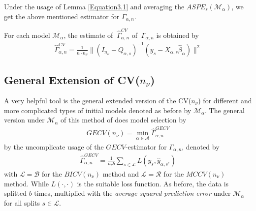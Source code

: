 \documentclass[Research_Module_ES.tex]{subfiles}
\begin{document}
Under the usage of Lemma \ref{Equation3.1} and averaging the $ASPE_{s}(\mathcal{M}_\alpha)$, we get the above mentioned estimator for $\Gamma_{\alpha,n}$.
\begin{claim}
	For each model $\mathcal{M}_\alpha$, the estimate of $~\hat{\Gamma}_{\alpha,n}^{CV}$ of $~\Gamma_{\alpha,n}$ is obtained by
	\begin{align*}
		\hat{\Gamma}_{\alpha,n}^{CV}=\frac{1}{n \cdot n_\nu}\parallel (I_{n_\nu}-Q_{\alpha,s})^{-1}(y_s-X_{\alpha,s}\hat{\beta}_\alpha)\parallel^2
	\end{align*}	
\end{claim}


	







\subsection{General Extension of CV($n_\nu$)}
A very helpful tool is the general extended version of the CV($n_\nu$) for different and more complicated types of initial models denoted as before by $\mathcal{M}_\alpha$. The general version under $\mathcal{M}_\alpha$ of this method of \cite{shao} does model selection by 
\begin{align*}
	GECV(n_\nu)=\min_{\alpha\in\mathcal{A}}\hat{\Gamma}_{\alpha,n}^{GECV}
\end{align*}
by the uncomplicate usage of the $GECV$-estimator for $\Gamma_{\alpha,n}$, denoted by
\begin{align*}
	\hat{\Gamma}_{\alpha,n}^{GECV}=\frac{1}{n_\nu b}\sum_{s\in\mathcal{L}}L(y_s,\hat{y}_{\alpha,s^c})
\end{align*} 
with $\mathcal{L}=\mathcal{B}$ for the $BICV(n_\nu)$ method and $\mathcal{L}=\mathcal{R}$ for the $MCCV(n_\nu)$ method. While $L(\cdot,\cdot)$ is the suitable loss function. As before, the data is splitted $b$ times, multiplied with the \textit{average squared prediction error} under $\mathcal{M}_\alpha$ for all splits $s\in\mathcal{L}$.
\end{document}
